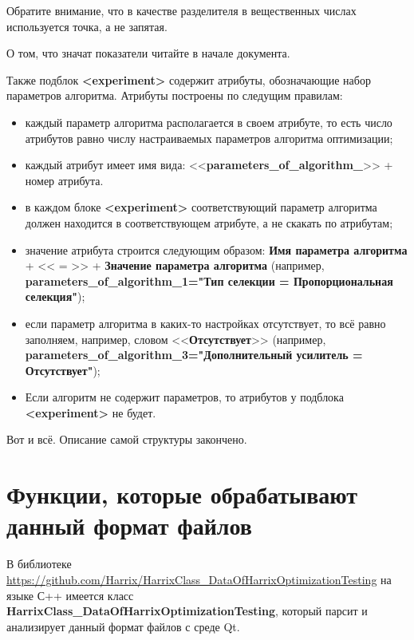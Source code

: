 \documentclass[a4paper,12pt]{article}
\begin{document}
Обратите внимание, что в качестве разделителя в вещественных числах используется точка, а не запятая.

О том, что значат показатели читайте в начале документа.

Также подблок \textbf{<experiment>} содержит атрибуты, обозначающие набор параметров алгоритма. Атрибуты построены по следущим правилам:
\begin{itemize}
\item каждый параметр алгоритма располагается в своем атрибуте, то есть число атрибутов равно числу настраиваемых параметров алгоритма оптимизации;
\item каждый атрибут имеет имя вида: <<\textbf{parameters\_of\_algorithm\_}>> + номер атрибута.
\item в каждом блоке \textbf{<experiment>} соответствующий параметр алгоритма должен находится в соответствующем атрибуте, а не скакать по атрибутам;
\item значение атрибута строится следующим образом: \textbf{Имя параметра алгоритма} + << = >> + \textbf{Значение параметра алгоритма} (например, \textbf{parameters\_of\_algorithm\_1="Тип селекции = Пропорциональная селекция"});
\item если параметр алгоритма в каких-то настройках отсутствует, то всё равно заполняем, например, словом <<\textbf{Отсутствует}>> (например, \textbf{parameters\_of\_algorithm\_3="Дополнительный усилитель = Отсутствует"});
\item Если алгоритм не содержит параметров, то атрибутов у подблока \textbf{<experiment>} не будет.
\end{itemize}

Вот и всё. Описание самой структуры закончено.

\section{Функции, которые обрабатывают данный формат файлов}

В библиотеке \href{https://github.com/Harrix/HarrixClass\_DataOfHarrixOptimizationTesting} {https://github.com/Harrix/HarrixClass\_DataOfHarrixOptimizationTesting} на языке С++ имеется класс \textbf{HarrixClass\_DataOfHarrixOptimizationTesting}, который парсит и анализирует данный формат файлов с среде Qt.
\end{document}
